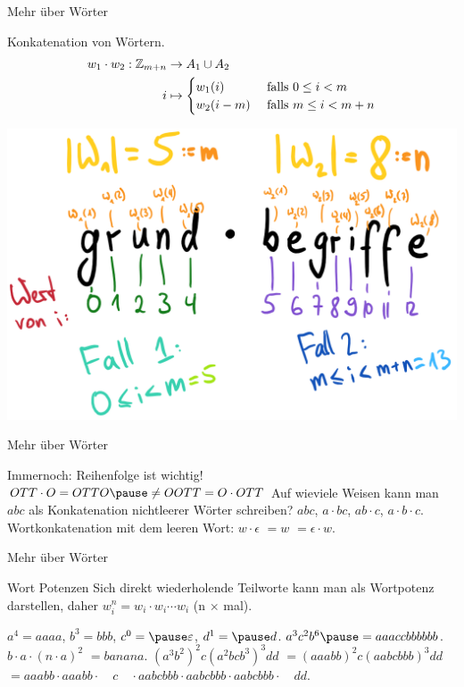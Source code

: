 \begin{frame}{Mehr über Wörter}
	
	\begin{block}{Konkatenation von Wörtern.}
		\begin{align*}
		w_1\cdot w_2 : \mathbb{Z}_{m+n} &\rightarrow A_1\cup A_2 \\
		i & \mapsto \begin{cases}
		w_1(i) & \text{ falls } 0\leq i<m \\
		w_2(i-m) & \text{ falls } m \leq i<m+n
		\end{cases}
		\end{align*}
	\end{block}

	\pause
	
	\begin{center}
	\includegraphics[width=.6\linewidth]{images/wortkonkatenation.png}
	\end{center}

\end{frame}

\begin{frame}{Mehr über Wörter}
	\begin{itemize}
		\pitem Immernoch: \pause Reihenfolge ist wichtig! \pause $OTT \cdot O = OTTO \pause \neq OOTT = O \cdot OTT$
		\pitem Auf wieviele Weisen kann man $abc$ als Konkatenation nichtleerer Wörter schreiben? \pause $abc$\pause , $a \cdot bc$\pause , $ab \cdot c$\pause , $a \cdot b \cdot c$. 
		\pitem Wortkonkatenation mit dem leeren Wort\pause : $w \cdot \epsilon$ \pause $ = w$ \pause $ = \epsilon \cdot w$.
	\end{itemize}
\end{frame}

\begin{frame}{Mehr über Wörter}
	\pause
	
	\begin{block}{Wort Potenzen}
		Sich direkt wiederholende Teilworte kann man als Wortpotenz darstellen\pause , daher $w_i^n = w_i \cdot w_i \cdots w_i$ (n $\times$ mal).
	\end{block}

	\begin{itemize}
		\pitem $a^4 = aaaa$\pause , $b^3 = bbb$\pause , $c^0 = \pause \epsilon$\pause , $d^1 = \pause d$.
		\pitem $a^3c^2b^6 \pause = aaaccbbbbbb$.
		\pitem $b \cdot a \cdot (n \cdot a)^2$ \pause $ = banana$.
		\pitem $(a^3b^2)^2c(a^2bcb^3)^3dd$ \pause $=(aaabb)^2c(aabcbbb)^3dd$ \pause $ = aaabb \cdot aaabb \cdot \quad c \quad \cdot aabcbbb \cdot aabcbbb \cdot aabcbbb \cdot \quad dd$.
	\end{itemize}
\end{frame}

